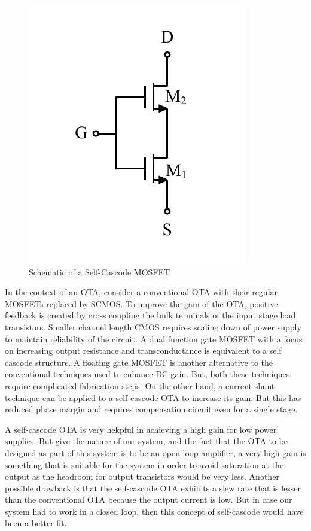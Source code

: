 \begin{figure} [H]
\centering
\includegraphics[scale=1]{Figures/Misc/PDFs/SCMOS.pdf}
\caption{Schematic of a Self-Cascode MOSFET}
\label{fig:SCMOS}
\end{figure}

In the context of an OTA, consider a conventional OTA with their regular MOSFETs replaced by SCMOS. To improve the gain of the OTA, positive feedback is created by cross coupling the bulk terminals of the input stage load transistors. Smaller channel length CMOS requires scaling down of power supply to maintain reliability of the circuit. A dual function gate MOSFET with a focus on increasing output resistance and transconductance is equivalent to a self cascode structure. A floating gate MOSFET is another alternative to the conventional techniques used to enhance DC gain. But, both these techniques require complicated fabrication steps. On the other hand, a current shunt technique can be applied to a self-cascode OTA to increase its gain. But this has reduced phase margin and requires compensation circuit even for a single stage.

A self-cascode OTA is very hekpful in achieving a high gain for low power supplies. But give the nature of our system, and the fact that the OTA to be designed as part of this system is to be an open loop amplifier, a very high gain is something that is suitable for the system in order to avoid saturation at the output as the headroom for output transistors would be very less. Another possible drawback is that the self-cascode OTA exhibits a slew rate that is lesser than the conventional OTA because the output current is low. But in case our system had to work in a closed loop, then this concept of self-cascode would have been a better fit.

